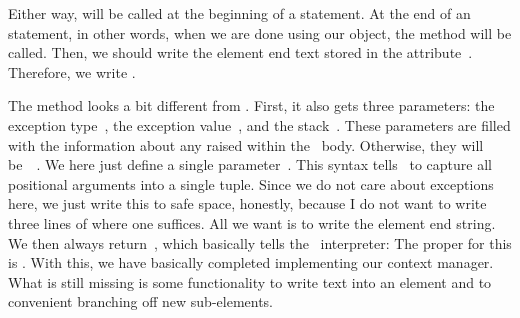 %
%
%
Either way,  will be called at the beginning of a  statement.
At the end of an  statement, in other words, when we are done using our object, the  method will be called.
Then, we should write the element end text stored in the attribute~.
Therefore, we write .

The  method looks a bit different from .
First, it also gets three parameters: the exception type~, the exception value~, and the stack~.
These parameters are filled with the information about any  raised within the ~body.
Otherwise, they will be~~\cite{PSF2024WSCM}.
We here just define a single parameter~.
This syntax tells \python\ to capture all positional arguments into a single tuple.
Since we do not care about exceptions here, we just write this to safe space, honestly, because I do not want to write three lines of  where one suffices.
All we want is to write the element end string.
We then always return~, which basically tells the \python~interpreter:
\emph{}
The proper  for this is .%
%
%
%
With this, we have basically completed implementing our context manager.
What is still missing is some functionality to write text into an element and to convenient branching off new sub-elements.

